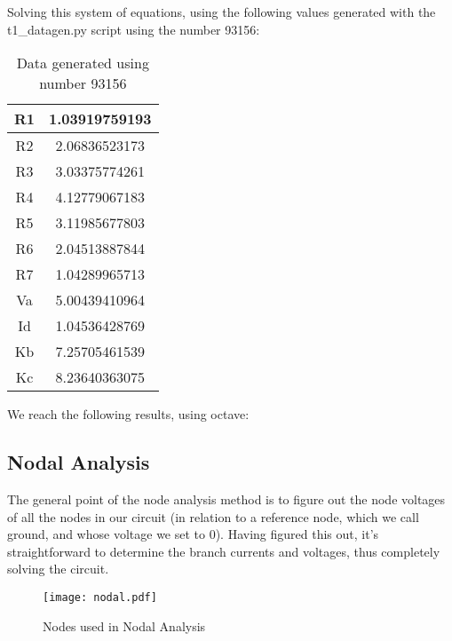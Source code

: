 \vspace{20mm}

Solving this system of equations, using the following values generated with the t1\_datagen.py script using the number 93156:


\begin{table}[H]
  \centering
  \begin{tabular}{ c c }
    R1 & 1.03919759193 \\ 
    \hline
    R2 & 2.06836523173 \\ 
    \hline
    R3 & 3.03375774261 \\ 
    \hline
    R4 & 4.12779067183 \\ 
    \hline
    R5 & 3.11985677803 \\ 
    \hline
    R6 & 2.04513887844 \\ 
    \hline
    R7 & 1.04289965713 \\ 
    \hline
    Va & 5.00439410964 \\ 
    \hline
    Id & 1.04536428769 \\ 
    \hline
    Kb & 7.25705461539 \\ 
    \hline
    Kc & 8.23640363075 \\ 
  \end{tabular}
  \caption{Data generated using number 93156}
  \label{tab:data}
\end{table}




We reach the following results, using octave:

    








\subsection{Nodal Analysis}

The general point of the node analysis method is to figure out the node voltages of all the nodes in our circuit (in relation to a reference node,
which we call ground, and whose voltage we set to 0). Having figured this out,
it's straightforward to determine the branch currents and voltages, thus completely solving the circuit. 
\par

\begin{figure}[H] \centering
  \texttt{[image: nodal.pdf]}
  \caption{Nodes used in Nodal Analysis}
  \label{fig:nodal}
\end{figure}

